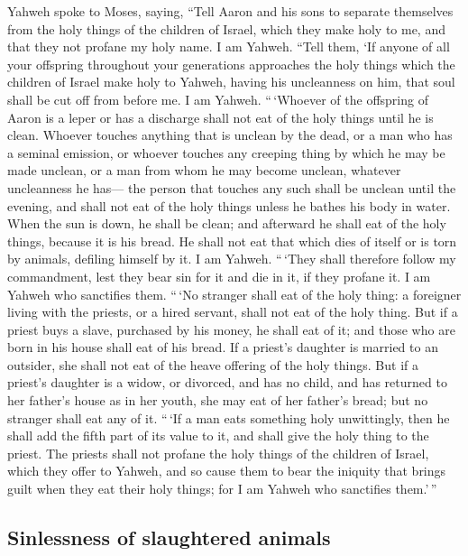  Yahweh spoke to Moses, saying,  ``Tell
Aaron and his sons to separate themselves from the holy things of the
children of Israel, which they make holy to me, and that they not
profane my holy name. I am Yahweh.  ``Tell them, `If
anyone of all your offspring throughout your generations approaches the
holy things which the children of Israel make holy to Yahweh, having his
uncleanness on him, that soul shall be cut off from before me. I am
Yahweh.  ``\,`Whoever of the offspring of Aaron is a leper
or has a discharge shall not eat of the holy things until he is clean.
Whoever touches anything that is unclean by the dead, or a man who has a
seminal emission,  or whoever touches any creeping thing
by which he may be made unclean, or a man from whom he may become
unclean, whatever uncleanness he has---  the person that
touches any such shall be unclean until the evening, and shall not eat
of the holy things unless he bathes his body in water. 
When the sun is down, he shall be clean; and afterward he shall eat of
the holy things, because it is his bread.  He shall not
eat that which dies of itself or is torn by animals, defiling himself by
it. I am Yahweh.  ``\,`They shall therefore follow my
commandment, lest they bear sin for it and die in it, if they profane
it. I am Yahweh who sanctifies them.  ``\,`No stranger
shall eat of the holy thing: a foreigner living with the priests, or a
hired servant, shall not eat of the holy thing.  But if a
priest buys a slave, purchased by his money, he shall eat of it; and
those who are born in his house shall eat of his bread. 
If a priest's daughter is married to an outsider, she shall not eat of
the heave offering of the holy things.  But if a priest's
daughter is a widow, or divorced, and has no child, and has returned to
her father's house as in her youth, she may eat of her father's bread;
but no stranger shall eat any of it.  ``\,`If a man eats
something holy unwittingly, then he shall add the fifth part of its
value to it, and shall give the holy thing to the priest.
 The priests shall not profane the holy things of the
children of Israel, which they offer to Yahweh,  and so
cause them to bear the iniquity that brings guilt when they eat their
holy things; for I am Yahweh who sanctifies them.'\,''

\hypertarget{sinlessness-of-slaughtered-animals}{%
\subsection{Sinlessness of slaughtered
animals}\label{sinlessness-of-slaughtered-animals}}

